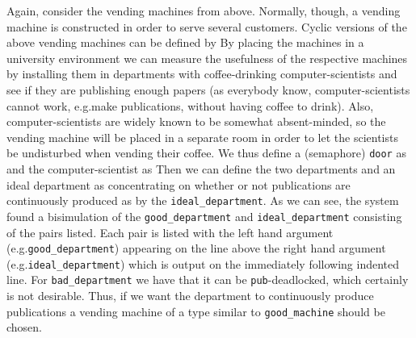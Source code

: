 Again, consider the vending machines from above. Normally, though, a vending machine is constructed in order to serve several customers. Cyclic versions of the above vending machines can be defined by
By placing  the machines in a university environment we can measure the usefulness of the respective machines by installing them in departments with coffee-drinking computer-scientists and see if they are publishing enough papers (as everybody know, computer-scientists cannot work, e.g.\@ make publications, without having coffee to drink). Also, computer-scientists are widely known to be somewhat absent-minded, so the vending machine will be placed in a separate room in order to let the scientists be undisturbed when vending their coffee. We thus define a (semaphore) \verb!door! as
%
and the computer-scientist as
%
Then we can define the two departments and an ideal department as
%
concentrating on whether or not publications are continuously produced as by the \verb!ideal_department!.
%
As we can see, the system found a bisimulation of the \verb!good_department! and \verb!ideal_department! consisting of the pairs listed. Each pair is listed with the left hand argument (e.g.\@ \verb!good_department!) appearing on the line above the right hand argument (e.g.\@ \verb!ideal_department!) which is output on the immediately following indented line. For \verb!bad_department! we have
%
that it can be \verb!pub!-deadlocked, which certainly is not desirable. Thus, if we want the department to continuously produce publications a vending machine of a type similar to \verb!good_machine! should be chosen.

